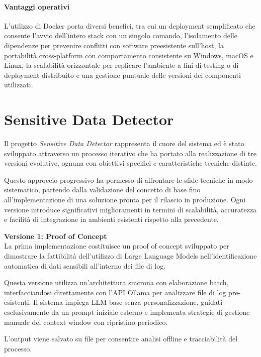 \documentclass[12pt]{report}
\begin{document}
\subsubsection{Vantaggi operativi}
L'utilizzo di Docker porta diversi benefici, tra cui un deployment semplificato che consente l'avvio dell'intero stack con un singolo comando, l'isolamento delle dipendenze per prevenire conflitti con software preesistente sull'host, la portabilità cross-platform con comportamento consistente su Windows, macOS e Linux, la scalabilità orizzontale per replicare l'ambiente a fini di testing o di deployment distribuito e una gestione puntuale delle versioni dei componenti utilizzati.


%
%

\chapter{Sensitive Data Detector}
\label{chap:sensitive_data_detector}

Il progetto \textit{Sensitive Data Detector} rappresenta il cuore del sistema ed è stato sviluppato attraverso un processo iterativo che ha portato alla realizzazione di tre versioni evolutive, ognuna con obiettivi specifici e caratteristiche tecniche distinte.

Questo approccio progressivo ha permesso di affrontare le sfide tecniche in modo sistematico, partendo dalla validazione del concetto di base fino all'implementazione di una soluzione pronta per il rilascio in produzione. Ogni versione introduce significativi miglioramenti in termini di scalabilità, accuratezza e facilità di integrazione in ambienti esistenti rispetto alla precedente.

\textbf{Versione 1: Proof of Concept} \\
La prima implementazione costituisce un proof of concept sviluppato per dimostrare la fattibilità dell'utilizzo di Large Language Models nell'identificazione automatica di dati sensibili all'interno dei file di log.

Questa versione utilizza un'architettura sincrona con elaborazione batch, interfacciandosi direttamente con l'API Ollama per analizzare file di log pre-esistenti. Il sistema impiega LLM base senza personalizzazione, guidati esclusivamente da un prompt iniziale esterno e implementa strategie di gestione manuale del context window con ripristino periodico.

L'output viene salvato su file per consentire analisi offline e tracciabilità del processo.
\end{document}
